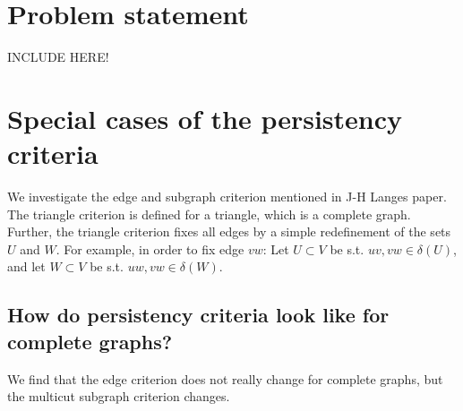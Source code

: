 \section{Problem statement}
INCLUDE HERE!

\section{Special cases of the persistency criteria}
We investigate the edge and subgraph criterion mentioned in J-H Langes paper. The triangle criterion is defined for a triangle, which is a complete graph. 
Further, the triangle criterion fixes all edges by a simple redefinement of the sets $U$ and $W$. For example, in order to fix edge $vw$: Let $U \subset V$ be s.t. $uv, vw \in \delta(U)$, and let $W \subset V$ be s.t. $uw, vw \in \delta(W)$. 
\subsection{How do persistency criteria look like for complete graphs?}
We find that the edge criterion does not really change for complete graphs, but the multicut subgraph criterion changes. 

